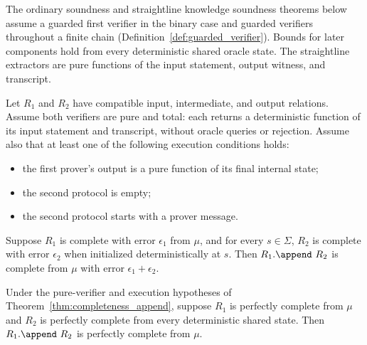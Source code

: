 The ordinary soundness and straightline knowledge soundness theorems below assume a guarded
first verifier in the binary case and guarded verifiers throughout a finite chain
(Definition~\ref{def:guarded_verifier}). Bounds for later components hold from every deterministic
shared oracle state. The straightline extractors are pure functions of the input statement, output
witness, and transcript.

\begin{theorem}
    \label{thm:completeness_append}
    Let $R_1$ and $R_2$ have compatible input, intermediate, and output relations.
    Assume both verifiers are pure and total: each returns a deterministic function of its input
    statement and transcript, without oracle queries or rejection. Assume also that at least one
    of the following execution conditions holds:
    \begin{itemize}
        \item the first prover's output is a pure function of its final internal state;
        \item the second protocol is empty;
        \item the second protocol starts with a prover message.
    \end{itemize}
    Suppose $R_1$ is complete with error $\epsilon_1$ from $\mu$, and for every $s \in \Sigma$,
    $R_2$ is complete with error $\epsilon_2$ when initialized deterministically at $s$.
    Then $R_1.\append\ R_2$ is complete from $\mu$ with error $\epsilon_1 + \epsilon_2$.
    \leanok
\end{theorem}

\begin{theorem}
    \label{thm:perfect_completeness_append}
    Under the pure-verifier and execution hypotheses of
    Theorem~\ref{thm:completeness_append}, suppose $R_1$ is perfectly complete from $\mu$ and
    $R_2$ is perfectly complete from every deterministic shared state.
    Then $R_1.\append\ R_2$ is perfectly complete from $\mu$.
    \leanok
\end{theorem}

